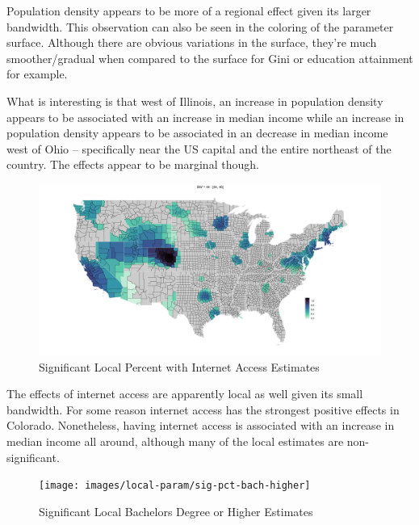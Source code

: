 \documentclass[
]{article}
\begin{document}
Population density appears to be more of a regional effect given its
larger bandwidth. This observation can also be seen in the coloring of
the parameter surface. Although there are obvious variations in the
surface, they're much smoother/gradual when compared to the surface for
Gini or education attainment for example.

What is interesting is that west of Illinois, an increase in population
density appears to be associated with an increase in median income while
an increase in population density appears to be associated in an
decrease in median income west of Ohio -- specifically near the US
capital and the entire northeast of the country. The effects appear to
be marginal though.

\begin{figure}[H]

{\centering \includegraphics[width=1\linewidth]{images/local-param/sig-internet-access} 

}

\caption{Significant Local Percent with Internet Access Estimates}\label{fig:unnamed-chunk-15}
\end{figure}

The effects of internet access are apparently local as well given its
small bandwidth. For some reason internet access has the strongest
positive effects in Colorado. Nonetheless, having internet access is
associated with an increase in median income all around, although many
of the local estimates are non-significant.

\begin{figure}[H]

{\centering \texttt{[image: images/local-param/sig-pct-bach-higher]} 

}

\caption{Significant Local Bachelors Degree or Higher Estimates}\label{fig:unnamed-chunk-16}
\end{figure}
\end{document}

